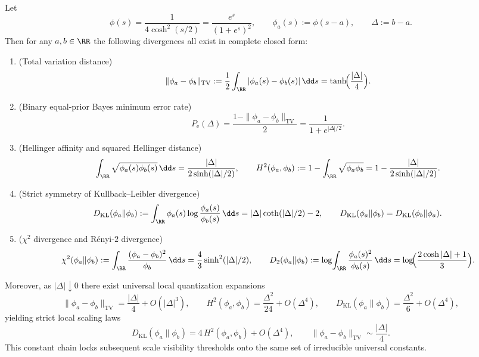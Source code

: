 \begin{proposition}\label{prop:xi-logistic-divergence-dictionary}
Let
\[
\phi(s)=\frac{1}{4\cosh^{2}(s/2)}=\frac{e^{s}}{(1+e^{s})^{2}},
\qquad
\phi_a(s):=\phi(s-a),
\qquad
\Delta:=b-a.
\]
Then for any \(a,b\in\RR\) the following divergences all exist in complete closed form:
\begin{enumerate}
  \item \textup{(Total variation distance)}
  \[
  \|\phi_a-\phi_b\|_{\mathrm{TV}}
  :=\frac12\int_{\RR}|\phi_a(s)-\phi_b(s)|\,\dd s
  =\tanh\!\Bigl(\frac{|\Delta|}{4}\Bigr).
  \]
  \item \textup{(Binary equal-prior Bayes minimum error rate)}
  \[
  P_{\mathrm e}(\Delta)
  =\frac{1-\|\phi_a-\phi_b\|_{\mathrm{TV}}}{2}
  =\frac{1}{1+e^{|\Delta|/2}}.
  \]
  \item \textup{(Hellinger affinity and squared Hellinger distance)}
  \[
  \int_{\RR}\sqrt{\phi_a(s)\phi_b(s)}\,\dd s
  =\frac{|\Delta|}{2\sinh(|\Delta|/2)},
  \qquad
  H^{2}(\phi_a,\phi_b)
  :=1-\int_{\RR}\sqrt{\phi_a\phi_b}
  =1-\frac{|\Delta|}{2\sinh(|\Delta|/2)}.
  \]
  \item \textup{(Strict symmetry of Kullback--Leibler divergence)}
  \[
  D_{\mathrm{KL}}(\phi_a\|\phi_b)
  :=\int_{\RR}\phi_a(s)\log\frac{\phi_a(s)}{\phi_b(s)}\,\dd s
  =|\Delta|\coth(|\Delta|/2)-2,
  \qquad
  D_{\mathrm{KL}}(\phi_a\|\phi_b)=D_{\mathrm{KL}}(\phi_b\|\phi_a).
  \]
  \item \textup{(\(\chi^2\) divergence and Rényi-\(2\) divergence)}
  \[
  \chi^2(\phi_a\|\phi_b)
  :=\int_{\RR}\frac{(\phi_a-\phi_b)^2}{\phi_b}\,\dd s
  =\frac{4}{3}\sinh^{2}(|\Delta|/2),
  \qquad
  D_2(\phi_a\|\phi_b)
  :=\log\!\int_{\RR}\frac{\phi_a(s)^2}{\phi_b(s)}\,\dd s
  =\log\!\Bigl(\frac{2\cosh|\Delta|+1}{3}\Bigr).
  \]
\end{enumerate}
Moreover, as \(|\Delta|\downarrow 0\) there exist universal local quantization expansions
\[
\|\phi_a-\phi_b\|_{\mathrm{TV}}=\frac{|\Delta|}{4}+O(|\Delta|^{3}),
\qquad
H^{2}(\phi_a,\phi_b)=\frac{\Delta^{2}}{24}+O(\Delta^{4}),
\qquad
D_{\mathrm{KL}}(\phi_a\|\phi_b)=\frac{\Delta^{2}}{6}+O(\Delta^{4}),
\]
yielding strict local scaling laws
\[
D_{\mathrm{KL}}(\phi_a\|\phi_b)=4\,H^{2}(\phi_a,\phi_b)+O(\Delta^{4}),
\qquad
\|\phi_a-\phi_b\|_{\mathrm{TV}}\sim\frac{|\Delta|}{4}.
\]
This constant chain locks subsequent scale visibility thresholds onto the same set of irreducible universal constants.
\end{proposition}
